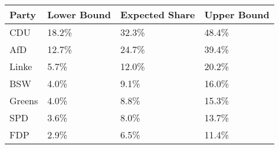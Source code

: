 \begin{tabular}{llll}
  \hline
Party & Lower Bound & Expected Share & Upper Bound \\ 
  \hline
CDU & 18.2\% & 32.3\% & 48.4\% \\ 
  AfD & 12.7\% & 24.7\% & 39.4\% \\ 
  Linke & 5.7\% & 12.0\% & 20.2\% \\ 
  BSW & 4.0\% & 9.1\% & 16.0\% \\ 
  Greens & 4.0\% & 8.8\% & 15.3\% \\ 
  SPD & 3.6\% & 8.0\% & 13.7\% \\ 
  FDP & 2.9\% & 6.5\% & 11.4\% \\ 
   \hline
\end{tabular}
